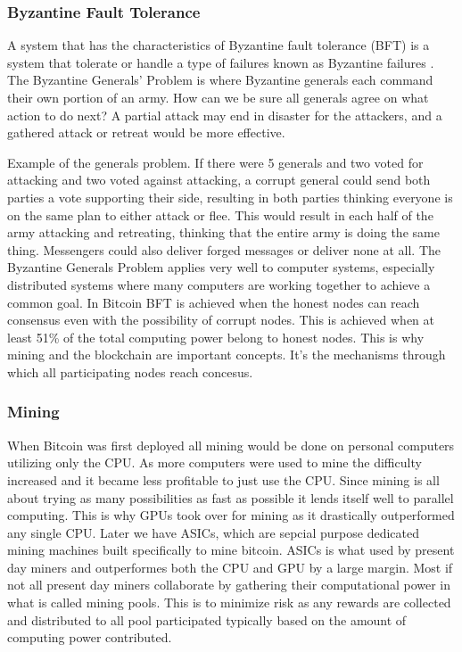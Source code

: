 \documentclass[12pt]{article}
\begin{document}
\subsubsection{Byzantine Fault Tolerance}

A system that has the characteristics of Byzantine fault tolerance (BFT) is a system that tolerate or handle a type of failures known as Byzantine failures \cite{lamport1982byzantine}. The Byzantine Generals' Problem is where Byzantine generals each command their own portion of an army. How can we be sure all generals agree on what action to do next? A partial attack may end in disaster for the attackers, and a gathered attack or retreat would be more effective.

Example of the generals problem. If there were 5 generals and two voted for attacking and two voted against attacking, a corrupt general could send both parties a vote supporting their side, resulting in both parties thinking everyone is on the same plan to either attack or flee. This would result in each half of the army attacking and retreating, thinking that the entire army is doing the same thing.  Messengers could also deliver forged messages or deliver none at all. The Byzantine Generals Problem applies very well to computer systems, especially distributed systems where many computers are working together to achieve a common goal. In Bitcoin BFT is achieved when the honest nodes can reach consensus even with the possibility of corrupt nodes. This is achieved when at least 51\% of the total computing power belong to honest nodes\cite{nakamoto2009bitcoin}\cite{tschorsch2015bitcoin}. This is why mining and the blockchain are important concepts. It's the mechanisms through which all participating nodes reach concesus.
 
\subsubsection{Mining}\label{subsubsec:mining}

When Bitcoin was first deployed all mining would be done on personal computers utilizing only the CPU. As more computers were used to mine the difficulty increased and it became less profitable to just use the CPU. Since mining is all about trying as many possibilities as fast as possible it lends itself well to parallel computing. This is why GPUs took over for mining as it drastically outperformed any single CPU. Later we have ASICs, which are sepcial purpose dedicated mining machines built specifically to mine bitcoin. ASICs is what used by present day miners and outperformes both the CPU and GPU by a large margin. Most if not all present day miners collaborate by gathering their computational power in what is called mining pools. This is to minimize risk as any rewards are collected and distributed to all pool participated typically based on the amount of computing power contributed. 
\end{document}
